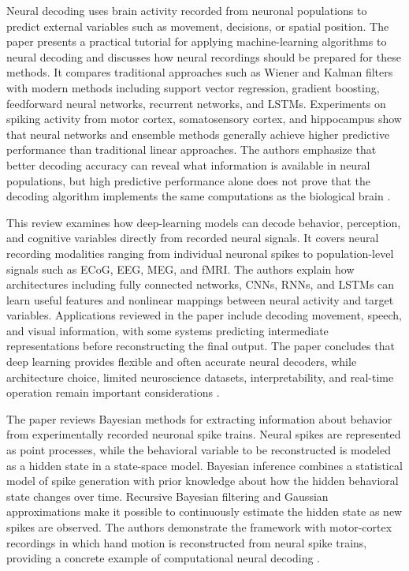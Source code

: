 \documentclass[a4paper]{article}
\begin{document}
        Neural decoding uses brain activity recorded from neuronal populations to predict external variables such as movement, decisions, or spatial position. The paper presents a practical tutorial for applying machine-learning algorithms to neural decoding and discusses how neural recordings should be prepared for these methods. It compares traditional approaches such as Wiener and Kalman filters with modern methods including support vector regression, gradient boosting, feedforward neural networks, recurrent networks, and LSTMs. Experiments on spiking activity from motor cortex, somatosensory cortex, and hippocampus show that neural networks and ensemble methods generally achieve higher predictive performance than traditional linear approaches. The authors emphasize that better decoding accuracy can reveal what information is available in neural populations, but high predictive performance alone does not prove that the decoding algorithm implements the same computations as the biological brain \cite{glaser-2020-machine-learning-for-neural-decoding}.
        
        This review examines how deep-learning models can decode behavior, perception, and cognitive variables directly from recorded neural signals. It covers neural recording modalities ranging from individual neuronal spikes to population-level signals such as ECoG, EEG, MEG, and fMRI. The authors explain how architectures including fully connected networks, CNNs, RNNs, and LSTMs can learn useful features and nonlinear mappings between neural activity and target variables. Applications reviewed in the paper include decoding movement, speech, and visual information, with some systems predicting intermediate representations before reconstructing the final output. The paper concludes that deep learning provides flexible and often accurate neural decoders, while architecture choice, limited neuroscience datasets, interpretability, and real-time operation remain important considerations \cite{livezey-2021-deep-learning-approaches-for-neural-decoding-across-architectures-and-recording-modalities}.
        
        The paper reviews Bayesian methods for extracting information about behavior from experimentally recorded neuronal spike trains. Neural spikes are represented as point processes, while the behavioral variable to be reconstructed is modeled as a hidden state in a state-space model. Bayesian inference combines a statistical model of spike generation with prior knowledge about how the hidden behavioral state changes over time. Recursive Bayesian filtering and Gaussian approximations make it possible to continuously estimate the hidden state as new spikes are observed. The authors demonstrate the framework with motor-cortex recordings in which hand motion is reconstructed from neural spike trains, providing a concrete example of computational neural decoding \cite{koyama-2010-bayesian-decoding-of-neural-spike-trains}.
        
        
        
\end{document}
